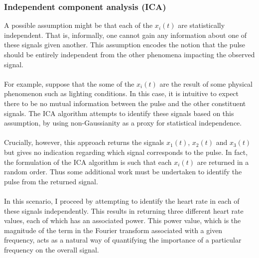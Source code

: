 \subsubsection{Independent component analysis (ICA)}
A possible assumption might be that each of the $x_i(t)$ are statistically independent. 
That is, informally, one cannot gain any information about one of these signals given another. 
This assumption encodes the notion that the pulse should be entirely independent from the other phenomena impacting the observed signal.
\\\\
For example, suppose that the some of the $x_i(t)$ are the result of some physical phenomenon such as lighting conditions. In this case, it is intuitive to expect there to be no mutual information between the pulse and the other constituent signals. The ICA algorithm attempts to identify these signals based on this assumption, by using non-Gaussianity as a proxy for statistical independence.
\\\\
Crucially, however, this approach returns the signals $x_1(t)$, $x_2(t)$ and $x_3(t)$ but gives no indication regarding which signal corresponds to the pulse. In fact, the formulation of the ICA algorithm is such that each $x_i(t)$ are returned in a random order. Thus some additional work must be undertaken to identify the pulse from the returned signal. 
\\\\
In this scenario, I proceed by attempting to identify the heart rate in each of these signals independently. This results in returning three different heart rate values, each of which has an associated power.
This power value, which is the magnitude of the term in the Fourier transform associated with a given frequency, acts as a natural way of quantifying the importance of a particular frequency on the overall signal.
\begin{figure}[H]
    \centering

\end{figure}

